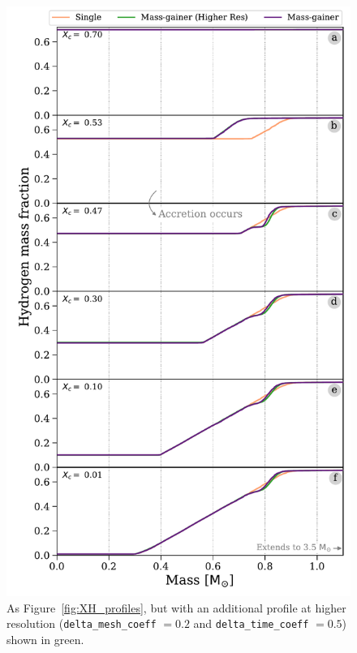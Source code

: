\documentclass[desactivate]{aa}
\begin{document}
\begin{figure}
    \centering
    \includegraphics[width=\columnwidth]{figures/XH_profiles_convergence.pdf}
    \caption{As Figure~\ref{fig:XH_profiles}, but with an additional profile at higher resolution (\texttt{delta\_mesh\_coeff} $ = 0.2$ and \texttt{delta\_time\_coeff} $ = 0.5$) shown in green.}
    \label{fig:xh_convergence}
\end{figure}
\end{document}
